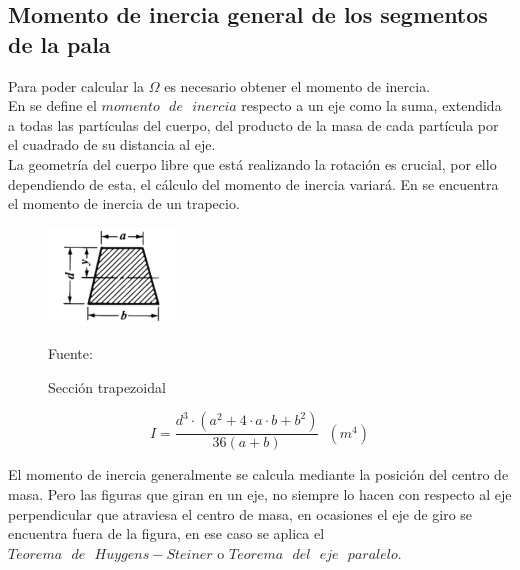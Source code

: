  
\subsection{Momento de inercia general de los segmentos de la pala}

Para poder calcular la $\Omega$ es necesario obtener el momento de inercia.\\

En \cite[p.~269]{goldstein1987mecanica} se define el $momento \text{ } de \text{ } inercia$ respecto a un eje como la suma, extendida a todas las partículas del cuerpo, del producto de la masa de cada partícula por el cuadrado de su distancia al eje.\\


La geometría del cuerpo libre que está realizando la rotación es crucial, por ello dependiendo de esta, el cálculo del momento de inercia variará. En \cite[p.~242]{oberg2012machinery} se encuentra el momento de inercia de un trapecio. \\


\begin{figure}[H]
    \centering
    \includegraphics[width=0.3\textwidth]{images/trapecio libro machinery.png}
    \caption{Sección trapezoidal}
    Fuente: \cite[p.~242]{oberg2012machinery}
    \label{fig:momento_inercia_libro}
\end{figure}



\begin{equation}
    I = \dfrac{ d^3 \cdot (a^2 + 4 \cdot a \cdot b + b^2)}{ 36 (a + b)} \hspace{7pt} (m^4) 
\end{equation}




El momento de inercia generalmente se calcula mediante la posición del centro de masa. Pero las figuras que giran en un eje, no siempre lo hacen con respecto al eje perpendicular que atraviesa el centro de masa, en ocasiones el eje de giro se encuentra fuera de la figura, en ese caso se aplica el $Teorema \text{ } de \text{ } Huygens-Steiner$ o $Teorema \text{ } del \text{ } eje \text{ } paralelo$. \\

